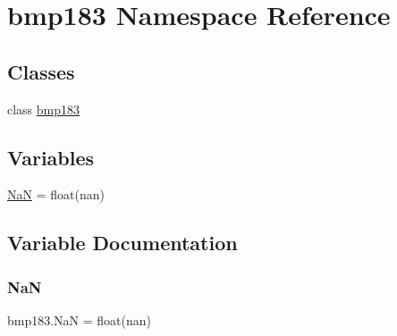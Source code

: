 \hypertarget{namespacebmp183}{}\section{bmp183 Namespace Reference}
\label{namespacebmp183}
\subsection*{Classes}
\begin{DoxyCompactItemize}
\item 
class \hyperlink{classbmp183_1_1bmp183}{bmp183}
\end{DoxyCompactItemize}
\subsection*{Variables}
\begin{DoxyCompactItemize}
\item 
\hyperlink{namespacebmp183_a2c3926dd39f72e83d5c9203297c7a998}{NaN} = float(\textquotesingle{}nan\textquotesingle{})
\end{DoxyCompactItemize}


\subsection{Variable Documentation}
\mbox{\label{namespacebmp183_a2c3926dd39f72e83d5c9203297c7a998}} 
\subsubsection{\texorpdfstring{NaN}{NaN}}
{\footnotesize\ttfamily bmp183.\+NaN = float(\textquotesingle{}nan\textquotesingle{})}

